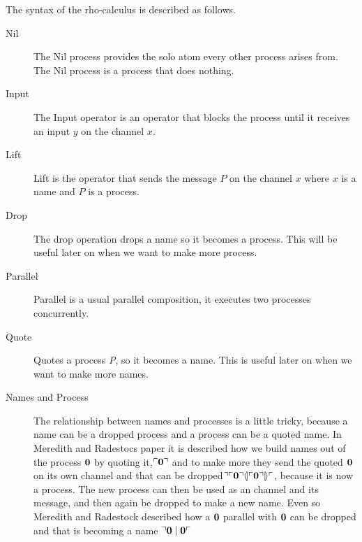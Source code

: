The syntax of the rho-calculus is described as follows.\\

\begin{description}
    \item[Nil] The Nil process provides the solo atom every other process arises from. The Nil process is a process that does nothing.
    \item[Input] The Input operator is an operator that blocks the process until it receives an input $y$ on the channel $x$.
    \item[Lift] Lift is the operator that sends the message $P$ on the channel $x$ where $x$ is a name and $P$ is a process.
    \item[Drop] The drop operation drops a name so it becomes a process. This will be useful later on when we want to make more process.
    \item[Parallel] Parallel is a usual parallel composition, it executes two processes concurrently.
    \item[Quote] Quotes a process \textit{P}, so it becomes a name. This is useful later on when we want to make more names.
    \item[Names and Process] The relationship between names and processes is a little tricky, because a name can be a dropped process and a process can be a quoted name. In Meredith and Radestocs paper\citep{Meredith2005} it is described how we build names out of the process $\mathbf{0}$ by quoting it,$\ulcorner \mathbf{0} \urcorner$ and to make more they send the quoted $\mathbf{0}$ on its own channel and that can be dropped$\urcorner \ulcorner \mathbf{0} \urcorner \langle \! | \ulcorner \mathbf{0} \urcorner | \! \rangle \ulcorner$, because it is now a process. The new process can then be used as an channel and its message, and then again be dropped to make a new name. Even so Meredith and Radestock\citep{Meredith2005} described how a $\mathbf{0}$ parallel with $\mathbf{0}$ can be dropped and that is becoming a name $\urcorner \mathbf{0} \mid \mathbf{0} \ulcorner$
\end{description}
